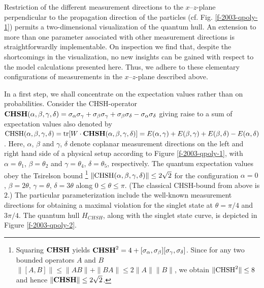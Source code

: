 Restriction of the different measurement
directions to the $x$--$z$-plane perpendicular to the propagation direction of the particles
(cf. Fig. \ref{f-2003-qpoly-1})
permits a two-dimensional visualization of
the quantum hull.
An extension to more than one parameter associated with other measurement
directions is straightforwardly implementable.
On inspection we find that, despite the shortcomings in the visualization, no new insights
can be gained with respect to the model calculations presented here.
Thus, we adhere to these elementary
configurations of measurements in the $x$--$z$-plane described above.

In a first step, we shall concentrate on the expectation values
rather than on probabilities.
Consider the CHSH-operator
$
  {\rm \bf CHSH}(\alpha ,\beta ,\gamma ,\delta )=
\sigma_\alpha \sigma_\gamma + \sigma_\beta \sigma_\gamma +
  \sigma_\beta \sigma_\delta - \sigma_\alpha \sigma_\delta
$ giving raise to a sum of expectation values also denoted by
${\rm CHSH}(\alpha ,\beta ,\gamma ,\delta )=
{\rm tr}[W\cdot {\rm \bf CHSH}(\alpha ,\beta ,\gamma ,\delta )]= E(\alpha,\gamma) +
  E(\beta,\gamma) + E(\beta,\delta) - E(\alpha,\delta)$.
Here, $\alpha$, $\beta$ and $\gamma$, $\delta$ denote coplanar measurement
directions on the left and right hand side of a physical setup according to
Figure \ref{f-2003-qpoly-1}, with $\alpha = \theta_1$, $\beta=\theta_2$ and
$\gamma=\theta_4$, $\delta=\theta_5$, respectively.
The quantum expectation values
obey the Tsirelson bound
\footnote{Squaring ${\rm \bf CHSH}$ yields  \cite[p. 174]{peres}
$
  {\rm  \bf  CHSH}^2=4+[\sigma_\alpha,\sigma_\beta][\sigma_\gamma,\sigma_\delta]
$.
Since  for any two bounded
operators $A$ and $B$
$
  \|[A,B]\| \leq \|A B\| + \|B A\| \leq 2\|A\|\|B\|
$,
we obtain $\| {\rm CHSH}^2 \| \leq 8$ and hence
$  \|{\rm \bf CHSH}\| \leq 2\sqrt{2}$.
}
$ \|{\rm  CHSH}(\alpha ,\beta ,\gamma ,\delta ) \|  \leq 2\sqrt{2}$
for the configuration
$\alpha=0$,
$\beta=2\theta$,
$\gamma=\theta$,
$\delta=3\theta$ along $0 \le \theta \le \pi$.
(The classical CHSH-bound from above is $2$.)
The
particular parameterization include the well-known
measurement directions for obtaining a maximal violation for the
singlet state at $\theta=\pi/4$ and $3\pi/4$.
The quantum hull $H_{CHSH}$, along
with the singlet state curve, is depicted in Figure \ref{f-2003-qpoly-2}.
